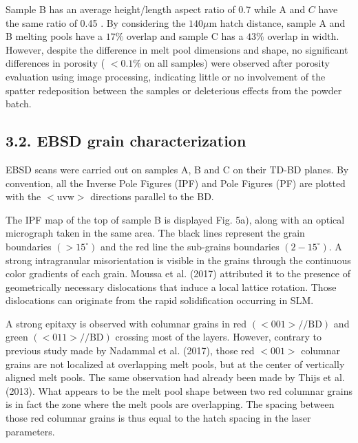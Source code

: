 \documentclass[10pt]{article}
\begin{document}
Sample B has an average height/length aspect ratio of 0.7 while A and $C$ have the same ratio of 0.45 . By considering the $140 \mu \mathrm{m}$ hatch distance, sample A and B melting pools have a $17 \%$ overlap and sample $\mathrm{C}$ has a $43 \%$ overlap in width. However, despite the difference in melt pool dimensions and shape, no significant differences in porosity ( $<0.1 \%$ on all samples) were observed after porosity evaluation using image processing, indicating little or no involvement of the spatter redeposition between the samples or deleterious effects from the powder batch.

\subsection*{3.2. EBSD grain characterization}
EBSD scans were carried out on samples A, B and C on their TD-BD planes. By convention, all the Inverse Pole Figures (IPF) and Pole Figures (PF) are plotted with the $<\mathrm{uvw}>$ directions parallel to the BD.

The IPF map of the top of sample B is displayed Fig. 5a), along with an optical micrograph taken in the same area. The black lines represent the grain boundaries $\left(>15^{\circ}\right)$ and the red line the sub-grains boundaries $\left(2-15^{\circ}\right)$. A strong intragranular misorientation is visible in the grains through the continuous color gradients of each grain. Moussa et al. (2017) attributed it to the presence of geometrically necessary dislocations that induce a local lattice rotation. Those dislocations can originate from the rapid solidification occurring in SLM.

A strong epitaxy is observed with columnar grains in red $(<001>/ / \mathrm{BD})$ and green $(<011>/ / \mathrm{BD})$ crossing most of the layers. However, contrary to previous study made by Nadammal et al. (2017), those red $<001>$ columnar grains are not localized at overlapping melt pools, but at the center of vertically aligned melt pools. The same observation had already been made by Thijs et al.(2013). What appears to be the melt pool shape between two red columnar grains is in fact the zone where the melt pools are overlapping. The spacing between those red columnar grains is thus equal to the hatch spacing in the laser parameters.
\end{document}
